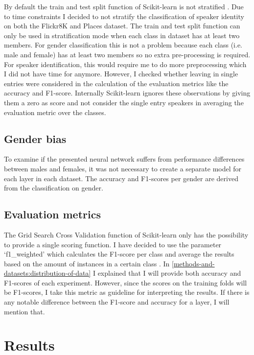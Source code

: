 \documentclass[a4paper, oneside]{book}
\begin{document}
By default the train and test split function of Scikit-learn is not stratified \cite{scikitlearntraintestsplit}. Due to time constraints I decided to not stratify the classification of speaker identity on both the Flickr8K and Places dataset. The train and test split function can only be used in stratification mode when each class in dataset has at least two members. For gender classification this is not a problem because each class (i.e. male and female) has at least two members so no extra pre-processing is required. For speaker identification, this would require me to do more preprocessing which I did not have time for anymore. However, I checked whether leaving in single entries were considered in the calculation of the evaluation metrics like the accuracy and F1-score. Internally Scikit-learn ignores these observations by giving them a zero as score and not consider the single entry speakers in averaging the evaluation metric over the classes. 

\subsection{Gender bias}\label{experimental-setup:gender-bias}

To examine if the presented neural network suffers from performance differences between males and females, it was not necessary to create a separate model for each layer in each dataset. The accuracy and F1-scores per gender are derived from the classification on gender.

\subsection{Evaluation metrics}\label{experimental-setup:evaluation-metrics}

The Grid Search Cross Validation function of Scikit-learn only has the possibility to provide a single scoring function. I have decided to use the parameter ‘f1\_weighted' which calculates the F1-score per class and average the results based on the amount of instances in a certain class \cite{scikitlearn20172}. In \autoref{methods-and-datasets:distribution-of-data} I explained that I will provide both accuracy and F1-scores of each experiment. However, since the scores on the training folds will be F1-scores, I take this metric as guideline for interpreting the results. If there is any notable difference between the F1-score and accuracy for a layer, I will mention that.

\section{Results}\label{experiments:results}
\end{document}
